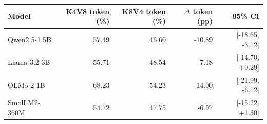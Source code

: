 \begin{tabular}{lrrrr}
\toprule
Model & K4V8 token (\%) & K8V4 token (\%) & $\Delta$ token (pp) & 95\% CI \\
\midrule
Qwen2.5-1.5B & 57.49 & 46.60 & -10.89 & [-18.65, -3.12] \\
Llama-3.2-3B & 55.71 & 48.54 & -7.18 & [-14.70, +0.29] \\
OLMo-2-1B & 68.23 & 54.23 & -14.00 & [-21.99, -6.12] \\
SmolLM2-360M & 54.72 & 47.75 & -6.97 & [-15.22, +1.30] \\
\bottomrule
\end{tabular}
